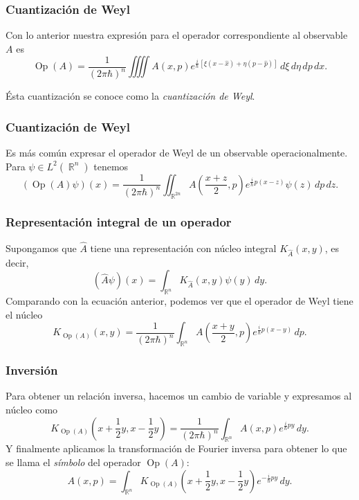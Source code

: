 \documentclass{beamer}
\DeclareMathOperator{\R}{\mathbb{R}}
\DeclareMathOperator{\Op}{Op}
\begin{document}
\begin{frame}
  \frametitle{Cuantización de Weyl}

  Con lo anterior nuestra expresión para el operador
  correspondiente al observable $A$ es
  \begin{equation}
    \label{eqn:weyl}
    \Op(A)
    = \frac{1}{(2\pi\hbar)^{n}} 
    \iiiint A(x,p) e^{\frac{i}{\hbar}[\xi(x-\hat{x}) +
    \eta(p-\hat{p})]} \, d\xi \, d\eta \, dp \, dx.
  \end{equation}

  Ésta cuantización se conoce como la \textit{cuantización
  de Weyl}.
\end{frame}

\begin{frame}
  \frametitle{Cuantización de Weyl}

  Es más común expresar el operador de Weyl de un observable
  operacionalmente. Para $\psi \in L^2(\R^{n})$ tenemos
  \begin{equation}
    (\Op(A)\psi)(x)
    = \frac{1}{(2\pi\hbar)^{n}} \iint_{\R^{2n}} A\left(
    \frac{x + z}{2}, p \right) e^{\frac{i}{\hbar} p (x -
  z)} \psi(z) \, dp \, dz.
  \end{equation}
\end{frame}

\begin{frame}
  \frametitle{Representación integral de un operador}

  Supongamos que $\hat{A}$ tiene una representación con
  núcleo integral $K_{\hat{A}}(x,y)$, es decir,
  \begin{equation}
    (\hat{A}\psi)(x)
    = \int_{\R^{n}} K_{\hat{A}}(x,y)\psi(y) \, dy.
  \end{equation}
  Comparando con la ecuación anterior, podemos ver que el
  operador de Weyl tiene el núcleo
  \begin{equation}
    K_{\Op(A)}(x,y)
    = \frac{1}{(2\pi\hbar)^{n}} 
    \int_{\R^{n}} A\left( \frac{x+y}{2}, p \right)
    e^{\frac{i}{\hbar} p (x-y)} \, dp.
  \end{equation}
\end{frame}

\begin{frame}
  \frametitle{Inversión}

  Para obtener un relación inversa, hacemos un cambio de
  variable y expresamos al núcleo como
  \begin{equation}
    K_{\Op(A)}\left(
      x + \frac{1}{2}y, x - \frac{1}{2}y
    \right)
    = \frac{1}{(2\pi\hbar)^{n}} \int_{\R^{n}}
    A(x,p) e^{\frac{i}{\hbar} p y} \, dy.
  \end{equation}
  Y finalmente aplicamos la transformación de Fourier
  inversa para obtener lo que se llama el \textit{símbolo}
  del operador $\Op(A)$:
  \begin{equation}
    A(x,p)
    = \int_{\R^{n}} K_{\Op(A)}\left( x + \frac{1}{2}y, x -
    \frac{1}{2}y \right) e^{-\frac{i}{\hbar} py} \, dy.
  \end{equation}
\end{frame}
\end{document}
